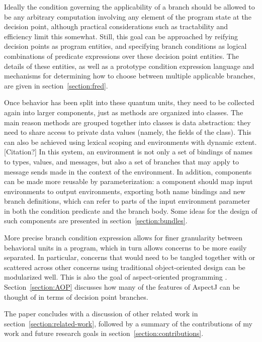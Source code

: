 \documentclass{article}
\begin{document}
Ideally the condition governing the applicability of a branch should
be allowed to be any arbitrary computation involving any element of
the program state at the decision point, although practical
considerations such as tractability and efficiency limit this
somewhat.  Still, this goal can be approached by reifying decision
points as program entities, and specifying branch conditions as
logical combinations of predicate expressions over these decision
point entities.  The details of these entities, as well as a prototype
condition expression language and mechanisms for determining how to
choose between multiple applicable branches, are given in
section~\ref{section:fred}.

Once behavior has been split into these quantum units, they need to be
collected again into larger components, just as methods are organized
into classes.  The main reason methods are grouped together into
classes is data abstraction: they need to share access to private data
values (namely, the fields of the class).  This can also be achieved
using lexical scoping and environments with dynamic
extent. [Citation?]  In this system, an environment is not only a set
of bindings of names to types, values, and messages, but also a set of
branches that may apply to message sends made in the context of the
environment.  In addition, components can be made more reusable by
parameterization: a component should map input environments to output
environments, exporting both name bindings and new branch definitions,
which can refer to parts of the input environment parameter in both
the condition predicate and the branch body.  Some ideas for the
design of such components are presented in
section~\ref{section:bundles}.

More precise branch condition expression allows for finer granularity
between behavioral units in a program, which in turn allows concerns
to be more easily separated.  In particular, concerns that would need
to be tangled together with or scattered across other concerns using
traditional object-oriented design can be modularized well.  This is
also the goal of aspect-oriented programming \cite{AOP}.
Section~\ref{section:AOP} discusses how many of the features of
AspectJ \cite{AspectJ} can be thought of in terms of decision point
branches.

The paper concludes with a discussion of other related work in
section~\ref{section:related-work}, followed by a summary of the
contributions of my work and future research goals in
section~\ref{section:contributions}.
\end{document}
